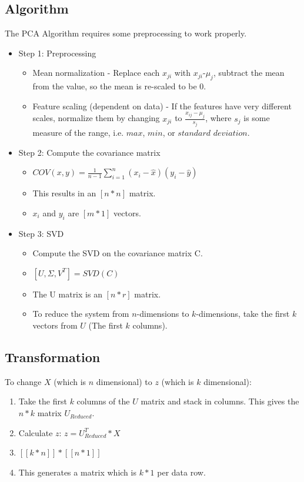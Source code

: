 \subsection{Algorithm}
The PCA Algorithm requires some preprocessing to work properly.
\begin{itemize}
    \item Step 1: Preprocessing
    \begin{itemize}
        \item Mean normalization - Replace each $x_{ji}$ with $x_{ji}$-$\mu_{j}$, subtract the mean from the value, so the mean is re-scaled to be 0.
        \item Feature scaling (dependent on data) - If the features have very different scales, normalize them by changing $x_{ji}$ to $\frac{x_{ij}-\mu_{j}}{s_{j}}$, where $s_{j}$ is some measure of the range, i.e. $max$, $min$, or $standard$ $deviation$.
    \end{itemize}
    \item Step 2: Compute the covariance matrix
    \begin{itemize}
        \item $COV(x, y) = \frac{1}{n-1}\sum_{i=1}^n(x_i-\hat{x})(y_i-\hat{y})$
        \item This results in an $\left[n*n\right]$ matrix.
        \item $x_i$ and $y_i$ are $\left[m*1\right]$ vectors.
    \end{itemize}
    \item Step 3: SVD
    \begin{itemize}
        \item Compute the SVD on the covariance matrix C.
        \item $\left[U, \Sigma, V^T\right] = SVD(C)$
        \item The U matrix is an $\left[n*r\right]$ matrix.
        \item To reduce the system from $n$-dimensions to $k$-dimensions, take the first $k$ vectors from $U$ (The first $k$ columns).
    \end{itemize}
\end{itemize}
\subsection{Transformation}
To change $X$ (which is $n$ dimensional) to $z$ (which is $k$ dimensional):
\begin{enumerate}
    \item Take the first $k$ columns of the $U$ matrix and stack in columns. This gives the $n*k$ matrix $U_{Reduced}$.
    \item Calculate $z$: $z = U_{Reduced}^T * X$
    \item $\left[[k*n]\right]*\left[[n*1]\right]$
    \item This generates a matrix which is $k*1$ per data row.
\end{enumerate}

